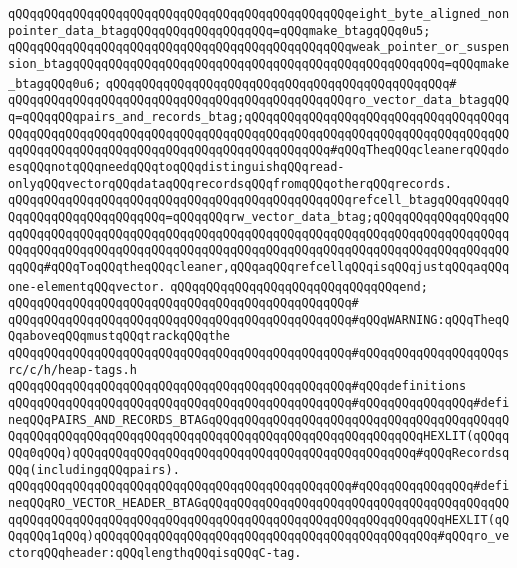 \verb|qQQqqQQqqQQqqQQqqQQqqQQqqQQqqQQqqQQqqQQqqQQqqQQqeight_byte_aligned_nonpointer_data_btagqQQqqQQqqQQqqQQqqQQq=qQQqmake_btagqQQq0u5;|\newline
\verb|qQQqqQQqqQQqqQQqqQQqqQQqqQQqqQQqqQQqqQQqqQQqqQQqweak_pointer_or_suspension_btagqQQqqQQqqQQqqQQqqQQqqQQqqQQqqQQqqQQqqQQqqQQqqQQqqQQq=qQQqmake_btagqQQq0u6;|\newline
\verb|qQQqqQQqqQQqqQQqqQQqqQQqqQQqqQQqqQQqqQQqqQQqqQQq#|\newline
\verb|qQQqqQQqqQQqqQQqqQQqqQQqqQQqqQQqqQQqqQQqqQQqqQQqro_vector_data_btagqQQq=qQQqqQQqpairs_and_records_btag;qQQqqQQqqQQqqQQqqQQqqQQqqQQqqQQqqQQqqQQqqQQqqQQqqQQqqQQqqQQqqQQqqQQqqQQqqQQqqQQqqQQqqQQqqQQqqQQqqQQqqQQqqQQqqQQqqQQqqQQqqQQqqQQqqQQqqQQqqQQqqQQqqQQqqQQq#qQQqTheqQQqcleanerqQQqdoesqQQqnotqQQqneedqQQqtoqQQqdistinguishqQQqread-onlyqQQqvectorqQQqdataqQQqrecordsqQQqfromqQQqotherqQQqrecords.|\newline
\verb|qQQqqQQqqQQqqQQqqQQqqQQqqQQqqQQqqQQqqQQqqQQqqQQqrefcell_btagqQQqqQQqqQQqqQQqqQQqqQQqqQQqqQQq=qQQqqQQqrw_vector_data_btag;qQQqqQQqqQQqqQQqqQQqqQQqqQQqqQQqqQQqqQQqqQQqqQQqqQQqqQQqqQQqqQQqqQQqqQQqqQQqqQQqqQQqqQQqqQQqqQQqqQQqqQQqqQQqqQQqqQQqqQQqqQQqqQQqqQQqqQQqqQQqqQQqqQQqqQQqqQQqqQQqqQQq#qQQqToqQQqtheqQQqcleaner,qQQqaqQQqrefcellqQQqisqQQqjustqQQqaqQQqone-elementqQQqvector.|\newline
\verb|qQQqqQQqqQQqqQQqqQQqqQQqqQQqqQQqend;|\newline
\verb|qQQqqQQqqQQqqQQqqQQqqQQqqQQqqQQqqQQqqQQqqQQqqQQq#|\newline
\verb|qQQqqQQqqQQqqQQqqQQqqQQqqQQqqQQqqQQqqQQqqQQqqQQq#qQQqWARNING:qQQqTheqQQqaboveqQQqmustqQQqtrackqQQqthe|\newline
\verb|qQQqqQQqqQQqqQQqqQQqqQQqqQQqqQQqqQQqqQQqqQQqqQQq#qQQqqQQqqQQqqQQqqQQqsrc/c/h/heap-tags.h|\newline
\verb|qQQqqQQqqQQqqQQqqQQqqQQqqQQqqQQqqQQqqQQqqQQqqQQq#qQQqdefinitions|\newline
\verb|qQQqqQQqqQQqqQQqqQQqqQQqqQQqqQQqqQQqqQQqqQQqqQQq#qQQqqQQqqQQqqQQq#defineqQQqPAIRS_AND_RECORDS_BTAGqQQqqQQqqQQqqQQqqQQqqQQqqQQqqQQqqQQqqQQqqQQqqQQqqQQqqQQqqQQqqQQqqQQqqQQqqQQqqQQqqQQqqQQqqQQqqQQqqQQqHEXLIT(qQQqqQQq0qQQq)qQQqqQQqqQQqqQQqqQQqqQQqqQQqqQQqqQQqqQQqqQQqqQQq#qQQqRecordsqQQq(includingqQQqpairs).|\newline
\verb|qQQqqQQqqQQqqQQqqQQqqQQqqQQqqQQqqQQqqQQqqQQqqQQq#qQQqqQQqqQQqqQQq#defineqQQqRO_VECTOR_HEADER_BTAGqQQqqQQqqQQqqQQqqQQqqQQqqQQqqQQqqQQqqQQqqQQqqQQqqQQqqQQqqQQqqQQqqQQqqQQqqQQqqQQqqQQqqQQqqQQqqQQqqQQqqQQqHEXLIT(qQQqqQQq1qQQq)qQQqqQQqqQQqqQQqqQQqqQQqqQQqqQQqqQQqqQQqqQQqqQQq#qQQqro_vectorqQQqheader:qQQqlengthqQQqisqQQqC-tag.|\newline
